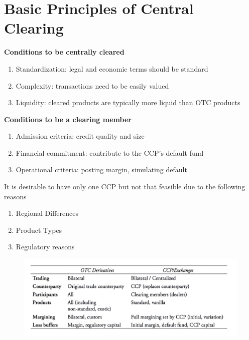 \documentclass[11pt,fleqn]{report} %
\numberwithin{equation}{section} %
\numberwithin{figure}{section} %
\numberwithin{table}{section} %
\begin{document}
\chapter{Basic Principles of Central Clearing}
 \begin{definition}\textbf{Conditions to be centrally cleared}
    \begin{enumerate}
        \item Standardization: legal and economic terms should be standard
        \item Complexity: transactions need to be easily valued
        \item Liquidity: cleared products are typically more liquid than OTC products
    \end{enumerate}
 \end{definition}
 \begin{definition}\textbf{Conditions to be a clearing member}
    \begin{enumerate}
        \item Admission criteria: credit quality and size
        \item Financial commitment: contribute to the CCP's default fund
        \item Operational criteria: posting margin, simulating default
    \end{enumerate}
 \end{definition}
 \begin{remark}It is desirable to have only one CCP but not that feasible due to the following reasons
    \begin{enumerate}
        \item Regional Differences
        \item Product Types
        \item Regulatory reasons
    \end{enumerate}
 \end{remark}
 \begin{figure}[h!]
    \begin{center}
        \includegraphics[scale=0.7]{Central.png}
    \end{center}
 \end{figure}
\end{document}
